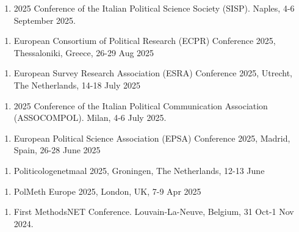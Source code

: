 \documentclass[10pt,]{article}
\providecommand{\tightlist}{%
  \setlength{\itemsep}{0pt}\setlength{\parskip}{0pt}}
\begin{document}
\begin{enumerate}
\def\labelenumi{\arabic{enumi}.}
\setcounter{enumi}{16}
\tightlist
\item
  2025 Conference of the Italian Political Science Society (SISP).
  Naples, 4-6 September 2025.
\end{enumerate}

\begin{enumerate}
\def\labelenumi{\arabic{enumi}.}
\setcounter{enumi}{15}
\tightlist
\item
  European Consortium of Political Research (ECPR) Conference 2025,
  Thessaloniki, Greece, 26-29 Aug 2025
\end{enumerate}

\begin{enumerate}
\def\labelenumi{\arabic{enumi}.}
\setcounter{enumi}{14}
\tightlist
\item
  European Survey Research Association (ESRA) Conference 2025, Utrecht,
  The Netherlands, 14-18 July 2025
\end{enumerate}

\begin{enumerate}
\def\labelenumi{\arabic{enumi}.}
\setcounter{enumi}{13}
\tightlist
\item
  2025 Conference of the Italian Political Communication Association
  (ASSOCOMPOL). Milan, 4-6 July 2025.
\end{enumerate}

\begin{enumerate}
\def\labelenumi{\arabic{enumi}.}
\setcounter{enumi}{12}
\tightlist
\item
  European Political Science Association (EPSA) Conference 2025, Madrid,
  Spain, 26-28 June 2025
\end{enumerate}

\begin{enumerate}
\def\labelenumi{\arabic{enumi}.}
\setcounter{enumi}{11}
\tightlist
\item
  Politicologenetmaal 2025, Groningen, The Netherlands, 12-13 June
\end{enumerate}

\begin{enumerate}
\def\labelenumi{\arabic{enumi}.}
\setcounter{enumi}{10}
\tightlist
\item
  PolMeth Europe 2025, London, UK, 7-9 Apr 2025
\end{enumerate}

\begin{enumerate}
\def\labelenumi{\arabic{enumi}.}
\setcounter{enumi}{9}
\tightlist
\item
  First MethodsNET Conference. Louvain-La-Neuve, Belgium, 31 Oct-1 Nov
  2024.
\end{enumerate}
\end{document}
